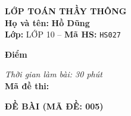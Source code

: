 \noindent
\begin{tcolorbox}[colback=white,colframe=black,arc=0mm,boxrule=0.8pt,top=4pt,bottom=4pt,left=6pt,right=6pt]
	\begin{minipage}[c]{0.44\textwidth}
		{\bfseries\large LỚP TOÁN THẦY THÔNG}\\[3pt]
		\textbf{Họ và tên:} \textbf{\large Hồ Dũng}\\[3pt]
		\textbf{Lớp:} LỚP 10 \quad -- \quad \textbf{Mã HS:} \texttt{HS027}
	\end{minipage}
	\hfill
	\begin{minipage}[c]{0.22\textwidth}
		\begin{tcolorbox}[colback=white,colframe=black,arc=0mm,boxrule=0.6pt,height=1.8cm,halign=center,valign=top,top=2pt]
			{\bfseries\normalsize Điểm}
		\end{tcolorbox}
	\end{minipage}
	\hfill
	\begin{minipage}[c]{0.30\textwidth}
		\raggedleft
		\textit{Thời gian làm bài: 30 phút}\\[4pt]
		\textbf{Mã đề thi:} 
	\end{minipage}
\end{tcolorbox}
\vspace{0.25cm}

\noindent\textbf{\large ĐỀ BÀI (MÃ ĐỀ: 005)}
\vspace{0.1cm}


